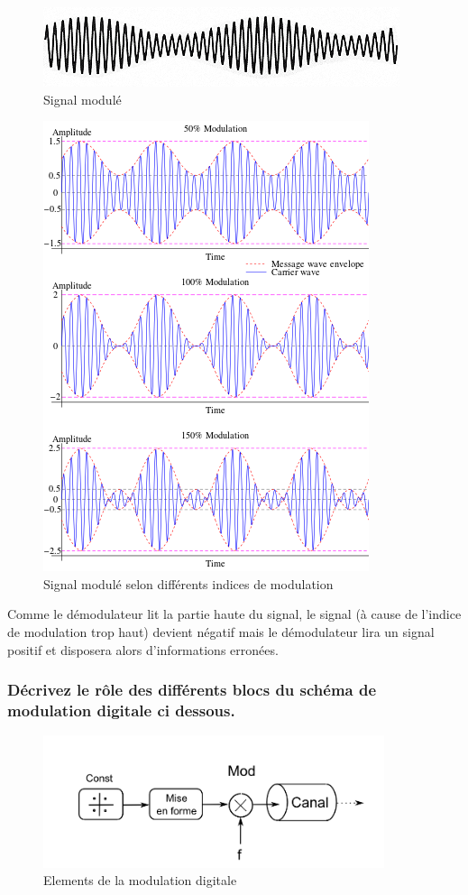 \begin{figure}[H]
    \begin{center}
        \includegraphics[width=0.335\linewidth]{img/signal_module.png}
        \caption{Signal modulé}
    \end{center}
\end{figure}

\begin{figure}[H]
    \begin{center}
        \includegraphics[width=0.5\linewidth]{img/indice_de_modulation_AM.png}
        \caption{Signal modulé selon différents indices de modulation}
    \end{center}
\end{figure}

Comme le démodulateur lit la partie haute du signal, le signal (à cause de l'indice de modulation trop haut) devient négatif mais le démodulateur lira un signal positif et disposera alors d'informations erronées.

\subsubsection{Décrivez le rôle des différents blocs du schéma de modulation digitale ci dessous.}
\begin{figure}[H]
  \centering
  \includegraphics[width=10cm]{img/exo.png}
  \caption{Elements de la modulation digitale}
\end{figure}

